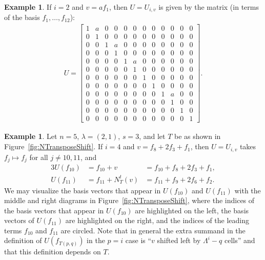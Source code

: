 \documentclass[11pt]{amsart}
\theoremstyle{definition}
\newtheorem{example}[theorem]{Example}
\begin{document}
\begin{example}
If $i=2$ and $v=af_1$, then $U = U_{i,v}$ is given by the matrix (in terms of the basis $f_1,\ldots,f_{12}$):
\setcounter{MaxMatrixCols}{12}
\begin{align}
    U=\begin{bmatrix}
    1 & a & 0 & 0 & 0 & 0 & 0 & 0 & 0 & 0 & 0 & 0 \\
    0 & 1 & 0 & 0 & 0 & 0 & 0 & 0 & 0 & 0 & 0 & 0 \\
    0 & 0 & 1 & a & 0 & 0 & 0 & 0 & 0 & 0 & 0 & 0 \\
    0 & 0 & 0 & 1 & 0 & 0 & 0 & 0 & 0 & 0 & 0 & 0 \\
    0 & 0 & 0 & 0 & 1 & a & 0 & 0 & 0 & 0 & 0 & 0 \\
    0 & 0 & 0 & 0 & 0 & 1 & 0 & 0 & 0 & 0 & 0 & 0 \\
    0 & 0 & 0 & 0 & 0 & 0 & 1 & 0 & 0 & 0 & 0 & 0 \\
    0 & 0 & 0 & 0 & 0 & 0 & 0 & 1 & 0 & 0 & 0 & 0 \\
    0 & 0 & 0 & 0 & 0 & 0 & 0 & 0 & 1 & a & 0 & 0 \\
    0 & 0 & 0 & 0 & 0 & 0 & 0 & 0 & 0 & 1 & 0 & 0 \\
    0 & 0 & 0 & 0 & 0 & 0 & 0 & 0 & 0 & 0 & 1 & 0 \\
    0 & 0 & 0 & 0 & 0 & 0 & 0 & 0 & 0 & 0 & 0 & 1
    \end{bmatrix}.
\end{align}

\end{example}

\begin{example}\label{ex:NTransposeShift}
Let $n = 5$, $\lambda = (2, 1)$, $s = 3$, and let $T$ be as shown in Figure~\ref{fig:NTransposeShift}.
If $i = 4$ and $v = f_8+2f_3+f_1$, then $U = U_{i,v}$ takes $f_j \mapsto f_j$ for all $j \ne 10, 11$, and
\begin{alignat}{3}
    U(f_{10}) &= f_{10} + v &= f_{10} + f_8 + 2f_3 + f_1, \\
    U(f_{11}) &= f_{11} + N_T^t(v) &{}= f_{11} + f_9 + 2f_6 + f_2.
\end{alignat}
We may visualize the basis vectors that appear in $U(f_{10})$ and $U(f_{11})$ with the middle and right diagrams in Figure~\ref{fig:NTransposeShift},
where the indices of the basis vectors that appear in $U(f_{10})$ are highlighted on the left, the basis vectors of $U(f_{11})$ are highlighted on the right, and the indices of the leading terms $f_{10}$ and $f_{11}$ are circled. Note that in general the extra summand in the definition of $U(f_{T(p,q)})$ in the $p=i$ case is ``$v$ shifted left by $\Lambda^i-q$ cells'' and that this definition depends on $T$.
\end{example}
\end{document}

